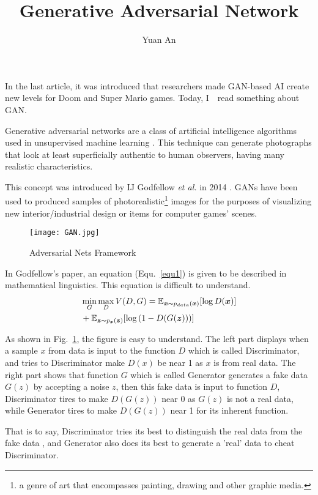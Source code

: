 \documentclass[a4paper,12pt,twocolumn]{article}
\title{Generative Adversarial Network}
\author{Yuan An}
\begin{document}
\maketitle
In the last article, it was introduced that researchers made GAN-based AI create new levels for Doom and Super Mario games. Today, I　read something about GAN.
\par
Generative adversarial networks are a class of artificial intelligence algorithms used in unsupervised machine learning \cite{GANwikipedia}. This technique can generate photographs that look at least superficially authentic to human observers, having many realistic characteristics.
\par
This concept was introduced by IJ Godfellow \emph{et al.} in 2014 \cite{Goodfellow2014Generative}. GANs have been used to produced samples of photorealistic\footnote{a genre of art that encompasses painting, drawing and other graphic media.} images for the purposes of visualizing new interior/industrial design or items for computer games' scenes.
\par
\begin{figure}
	\centering
	\texttt{[image: GAN.jpg]}
	\caption{Adversarial Nets Framework}\label{ANF}
\end{figure}
\par
In Godfellow's paper, an equation (Equ.~\ref{equ1}) is given to be described in mathematical linguistics. This equation is difficult to understand.
\begin{equation}
\begin{split}
	&\min_{G} \max_{D}V(D,G) = \mathbb{E}_{\boldsymbol{x}\thicksim p_{data}(\boldsymbol{x})}[\log{D(\boldsymbol{x})}]\\
	&+\mathbb{E}_{\boldsymbol{z}\thicksim p_{\boldsymbol{z}} (\boldsymbol{z})} [\log{(1-D(G(\boldsymbol{z})))}]
\end{split}
\label{equ1}
\end{equation}
\par
As shown in Fig.~\ref{ANF}, the figure is easy to understand. The left part displays when a sample $x$ from data is input to the function $D$ which is called Discriminator, and tries to Discriminator make $D(x)$ be near 1 as $x$ is from real data. The right part shows that function $G$ which is called Generator generates a fake data $G(z)$ by accepting a noise $z$, then this fake data is input to function $D$, Discriminator tires to make $D(G(z))$ near 0 as $G(z)$ is not a real data, while Generator tires to make $D(G(z))$ near 1 for its inherent function.
\par
That is to say, Discriminator tries its best to distinguish the real data from the fake data , and Generator also does its best to generate a 'real' data to cheat Discriminator.



\end{document}
